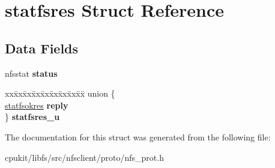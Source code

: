 \hypertarget{structstatfsres}{}\section{statfsres Struct Reference}
\label{structstatfsres}
\subsection*{Data Fields}
\begin{DoxyCompactItemize}
\item 
\mbox{\label{structstatfsres_af7811b1962b86d3e280196df0432cba7}} 
nfsstat {\bfseries status}
\item 
\mbox{\label{structstatfsres_adce23cc848a523a67f5d959a1df173ea}} 
\begin{tabbing}
xx\=xx\=xx\=xx\=xx\=xx\=xx\=xx\=xx\=\kill
union \{\\
\>\mbox{\hyperlink{structstatfsokres}{statfsokres}} {\bfseries reply}\\
\} {\bfseries statfsres\_u}\\

\end{tabbing}\end{DoxyCompactItemize}


The documentation for this struct was generated from the following file\+:\begin{DoxyCompactItemize}
\item 
cpukit/libfs/src/nfsclient/proto/nfs\+\_\+prot.\+h\end{DoxyCompactItemize}
